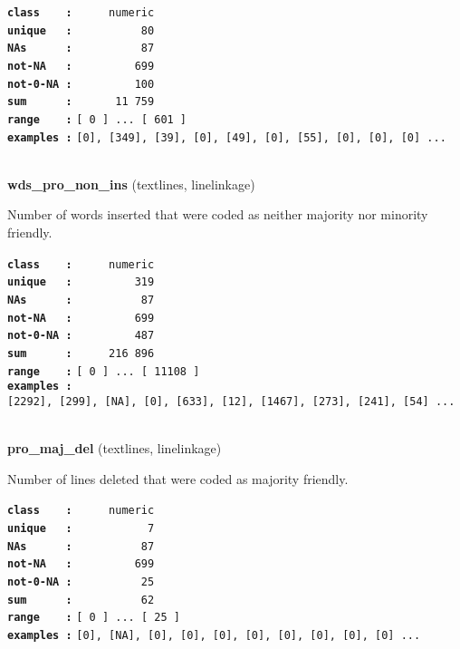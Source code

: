 \documentclass[]{article}
\begin{document}
\textbf{\texttt{class\ \ \ \ :}} \texttt{~~~~~numeric}\\
\textbf{\texttt{unique\ \ \ :}} \texttt{~~~~~~~~~~80}\\
\textbf{\texttt{NAs\ \ \ \ \ \ :}} \texttt{~~~~~~~~~~87}\\
\textbf{\texttt{not-NA\ \ \ :}} \texttt{~~~~~~~~~699}\\
\textbf{\texttt{not-0-NA\ :}} \texttt{~~~~~~~~~100}\\
\textbf{\texttt{sum\ \ \ \ \ \ :}} \texttt{~~~~~~11~759}\\
\textbf{\texttt{range\ \ \ \ :}}
\texttt{{[}\ 0\ {]}\ ...\ {[}\ 601\ {]}}\\
\textbf{\texttt{examples\ :}}
\texttt{{[}0{]},\ {[}349{]},\ {[}39{]},\ {[}0{]},\ {[}49{]},\ {[}0{]},\ {[}55{]},\ {[}0{]},\ {[}0{]},\ {[}0{]}\ ...}\\

~

\textbf{wds\_pro\_non\_ins} (textlines, linelinkage)

Number of words inserted that were coded as neither majority nor
minority friendly.

\textbf{\texttt{class\ \ \ \ :}} \texttt{~~~~~numeric}\\
\textbf{\texttt{unique\ \ \ :}} \texttt{~~~~~~~~~319}\\
\textbf{\texttt{NAs\ \ \ \ \ \ :}} \texttt{~~~~~~~~~~87}\\
\textbf{\texttt{not-NA\ \ \ :}} \texttt{~~~~~~~~~699}\\
\textbf{\texttt{not-0-NA\ :}} \texttt{~~~~~~~~~487}\\
\textbf{\texttt{sum\ \ \ \ \ \ :}} \texttt{~~~~~216~896}\\
\textbf{\texttt{range\ \ \ \ :}}
\texttt{{[}\ 0\ {]}\ ...\ {[}\ 11108\ {]}}\\
\textbf{\texttt{examples\ :}}
\texttt{{[}2292{]},\ {[}299{]},\ {[}NA{]},\ {[}0{]},\ {[}633{]},\ {[}12{]},\ {[}1467{]},\ {[}273{]},\ {[}241{]},\ {[}54{]}\ ...}\\

~

\textbf{pro\_maj\_del} (textlines, linelinkage)

Number of lines deleted that were coded as majority friendly.

\textbf{\texttt{class\ \ \ \ :}} \texttt{~~~~~numeric}\\
\textbf{\texttt{unique\ \ \ :}} \texttt{~~~~~~~~~~~7}\\
\textbf{\texttt{NAs\ \ \ \ \ \ :}} \texttt{~~~~~~~~~~87}\\
\textbf{\texttt{not-NA\ \ \ :}} \texttt{~~~~~~~~~699}\\
\textbf{\texttt{not-0-NA\ :}} \texttt{~~~~~~~~~~25}\\
\textbf{\texttt{sum\ \ \ \ \ \ :}} \texttt{~~~~~~~~~~62}\\
\textbf{\texttt{range\ \ \ \ :}}
\texttt{{[}\ 0\ {]}\ ...\ {[}\ 25\ {]}}\\
\textbf{\texttt{examples\ :}}
\texttt{{[}0{]},\ {[}NA{]},\ {[}0{]},\ {[}0{]},\ {[}0{]},\ {[}0{]},\ {[}0{]},\ {[}0{]},\ {[}0{]},\ {[}0{]}\ ...}\\
\end{document}
